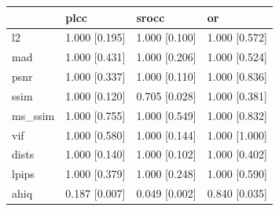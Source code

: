\begin{tabular}{llll}
\toprule
 & plcc & srocc & or \\
\midrule
l2 & 1.000 [0.195] & 1.000 [0.100] & 1.000 [0.572] \\
mad & 1.000 [0.431] & 1.000 [0.206] & 1.000 [0.524] \\
psnr & 1.000 [0.337] & 1.000 [0.110] & 1.000 [0.836] \\
ssim & 1.000 [0.120] & 0.705 [0.028] & 1.000 [0.381] \\
ms_ssim & 1.000 [0.755] & 1.000 [0.549] & 1.000 [0.832] \\
vif & 1.000 [0.580] & 1.000 [0.144] & 1.000 [1.000] \\
dists & 1.000 [0.140] & 1.000 [0.102] & 1.000 [0.402] \\
lpips & 1.000 [0.379] & 1.000 [0.248] & 1.000 [0.590] \\
ahiq & 0.187 [0.007] & 0.049 [0.002] & 0.840 [0.035] \\
\bottomrule
\end{tabular}
